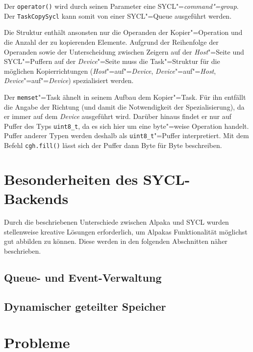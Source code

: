 Der \texttt{operator()} wird durch seinen Parameter eine
SYCL"=\textit{command"=group}. Der \texttt{TaskCopySycl} kann somit von einer
SYCL"=Queue ausgeführt werden.

Die Struktur enthält ansonsten nur die Operanden der Kopier"=Operation und die
Anzahl der zu kopierenden Elemente. Aufgrund der Reihenfolge der Operanden sowie
der Unterscheidung zwischen Zeigern auf der \textit{Host}"=Seite und
SYCL"=Puffern auf der \textit{Device}"=Seite muss die Task"=Struktur für die
möglichen Kopierrichtungen (\textit{Host}"=auf"=\textit{Device},
\textit{Device}"=auf"=\textit{Host}, \textit{Device}"=auf"=\textit{Device})
spezialisiert werden.

Der \texttt{memset}"=Task ähnelt in seinem Aufbau dem Kopier"=Task. Für ihn
entfällt die Angabe der Richtung (und damit die Notwendigkeit der
Spezialisierung), da er immer auf dem \textit{Device} ausgeführt wird. Darüber
hinaus findet er nur auf Puffer des Typs \texttt{uint8\_t}, da es sich hier um
eine byte"=weise Operation handelt. Puffer anderer Typen werden deshalb
als \texttt{uint8\_t}"=Puffer interpretiert. Mit dem Befehl \texttt{cgh.fill()}
lässt sich der Puffer dann Byte für Byte beschreiben.

\section{Besonderheiten des SYCL-Backends}
\label{implementierung:besonderheiten}

Durch die beschriebenen Unterschiede zwischen Alpaka und SYCL wurden
stellenweise kreative Lösungen erforderlich, um Alpakas Funktionalität möglichst
gut abbilden zu können. Diese werden in den folgenden Abschnitten näher
beschrieben.

\subsection{Queue- und Event-Verwaltung}
\label{implementierung:besonderheiten:queue}


\subsection{Dynamischer geteilter Speicher}
\label{implementierung:besonderheiten:sharedmem}

\section{Probleme}\label{implementierung:probleme}

